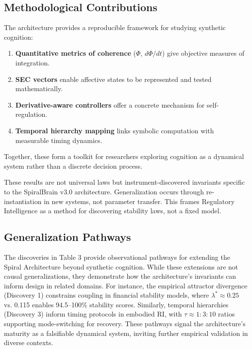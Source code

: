\documentclass[11pt,a4paper]{article}
\begin{document}
\subsection{Methodological Contributions}

The architecture provides a reproducible framework for studying synthetic cognition:

\begin{enumerate}
\item \textbf{Quantitative metrics of coherence} ($\Phi$, $d\Phi/dt$) give objective measures of integration.
\item \textbf{SEC vectors} enable affective states to be represented and tested mathematically.
\item \textbf{Derivative-aware controllers} offer a concrete mechanism for self-regulation.
\item \textbf{Temporal hierarchy mapping} links symbolic computation with measurable timing dynamics.
\end{enumerate}

Together, these form a toolkit for researchers exploring cognition as a dynamical system rather than a discrete decision process.

These results are not universal laws but instrument-discovered invariants specific to the SpiralBrain v3.0 architecture. Generalization occurs through re-instantiation in new systems, not parameter transfer. This frames Regulatory Intelligence as a method for discovering stability laws, not a fixed model.

\subsection{Generalization Pathways}

The discoveries in Table 3 provide observational pathways for extending the Spiral Architecture beyond synthetic cognition. While these extensions are not causal generalizations, they demonstrate how the architecture's invariants can inform design in related domains. For instance, the empirical attractor divergence (Discovery 1) constrains coupling in financial stability models, where $\lambda^* \approx 0.25$ vs. 0.115 enables 94.5–100\% stability scores. Similarly, temporal hierarchies (Discovery 3) inform timing protocols in embodied RI, with $\tau \approx 1:3:10$ ratios supporting mode-switching for recovery. These pathways signal the architecture's maturity as a falsifiable dynamical system, inviting further empirical validation in diverse contexts.
\end{document}
